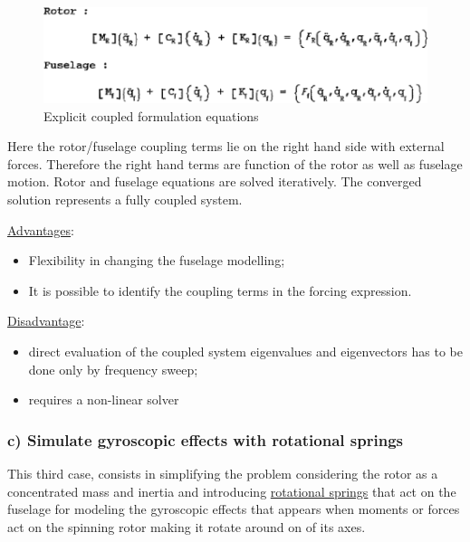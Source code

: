 \smallskip
\begin{figure}[h]
	\begin{center}
		\centering  		 		
		\includegraphics[width=0.9\linewidth]{PICTURES/3b_coupling/eq_2.png}
	\end{center}
	\caption {Explicit coupled formulation equations}
\end{figure}

\noindent
Here the rotor/fuselage coupling terms lie on the right hand side with external forces. Therefore the right hand terms are function of the rotor as well as fuselage motion. Rotor and fuselage equations are solved iteratively. The converged solution represents a fully coupled system.

\medskip
\underline{Advantages}: 
\begin{itemize}
	\item Flexibility in changing the fuselage modelling;
	\item It is possible to identify the coupling terms in the forcing expression.
\end{itemize}

\underline{Disadvantage}: 
\begin{itemize}
	\item direct evaluation of the coupled system eigenvalues and eigenvectors has to be done only by frequency sweep;
	\item requires a non-linear solver
\end{itemize}


\bigskip
\subsubsection*{c) Simulate gyroscopic effects with rotational springs}
\noindent
This third case, consists in simplifying the problem considering the rotor as a concentrated mass and inertia and introducing \underline{rotational springs} that act on the fuselage for modeling the gyroscopic effects that appears when moments or forces act on the spinning rotor making it rotate around on of its axes. 

